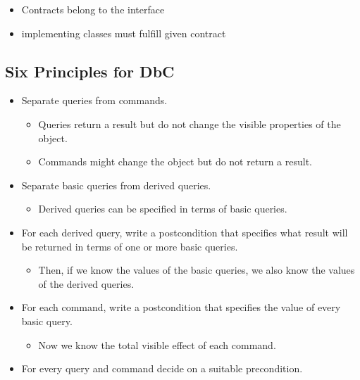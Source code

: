 \begin{itemize}
\tightlist
\item
  Contracts belong to the interface
\item
  implementing classes must fulfill given contract
\end{itemize}

\hypertarget{six-principles-for-dbc}{%
\subsection{Six Principles for DbC}\label{six-principles-for-dbc}}

\begin{itemize}
\tightlist
\item
  Separate queries from commands.

  \begin{itemize}
  \tightlist
  \item
    Queries return a result but do not change the visible properties of
    the object.
  \item
    Commands might change the object but do not return a result.
  \end{itemize}
\item
  Separate basic queries from derived queries.

  \begin{itemize}
  \tightlist
  \item
    Derived queries can be specified in terms of basic queries.
  \end{itemize}
\item
  For each derived query, write a postcondition that specifies what
  result will be returned in terms of one or more basic queries.

  \begin{itemize}
  \tightlist
  \item
    Then, if we know the values of the basic queries, we also know the
    values of the derived queries.
  \end{itemize}
\item
  For each command, write a postcondition that specifies the value of
  every basic query.

  \begin{itemize}
  \tightlist
  \item
    Now we know the total visible effect of each command.
  \end{itemize}
\item
  For every query and command decide on a suitable precondition.


\end{itemize}
